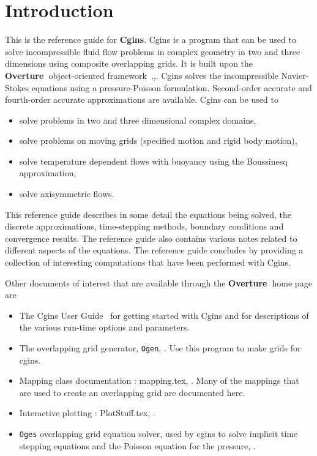 \documentclass[10pt]{article}
\newcommand{\Overture}{{\bf Over\-ture\ }}
\begin{document}
\clearpage
\tableofcontents

\vfill\eject


\section{Introduction}

This is the reference guide for {\bf Cgins}.  Cgins is a program that can be
used to solve incompressible fluid flow problems in complex geometry in two and
three dimensions using composite overlapping grids. It is built upon the
\Overture object-oriented framework~\cite{Brown97},\cite{Henshaw96a},\cite{iscope97}.  Cgins solves the incompressible
Navier-Stokes equations using a pressure-Poisson formulation. Second-order
accurate and fourth-order accurate approximations are available.
Cgins can be used to
\begin{itemize}
  \item solve problems in two and three dimensional complex domains,
  \item solve problems on moving grids (specified motion and rigid body motion), 
  \item solve temperature dependent flows with buoyancy using the Boussinesq approximation,  
  \item solve axisymmetric flows.
\end{itemize} 
This reference guide describes in some detail the equations being solved,
the discrete approximations, time-stepping methods, boundary conditions and convergence results. 
The reference guide also contains various notes related to different aspects of the equations. 
The reference guide concludes by providing a collection of interesting computations that
have been performed with Cgins. 

\noindent
Other documents of interest that are available through the \Overture home page are
\begin{itemize}
\item The Cgins User Guide~\cite{CginsUserGuide} for getting started with Cgins and for descriptions
      of the various run-time options and parameters.
\item The overlapping grid generator, {\tt Ogen}, \cite{OGEN}. Use this program to make grids for cgins.
\item Mapping class documentation : {\ff mapping.tex}, \cite{MAPPINGS}. Many of the mappings that
   are used to create an overlapping grid are documented here. 
\item Interactive plotting : {\ff PlotStuff.tex}, \cite{PLOTSTUFF}.
\item {\tt Oges} overlapping grid equation solver, used by cgins to solve implicit time stepping
    equations and the Poisson equation for the pressure, \cite{OGES}.
\end{itemize}
\end{document}
